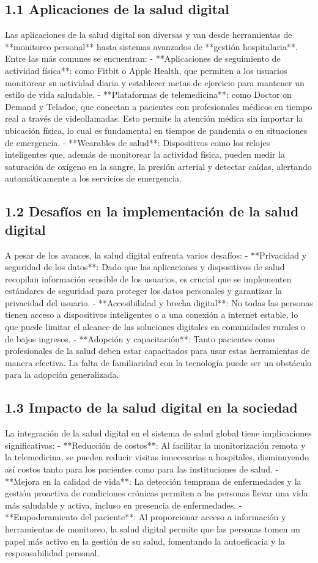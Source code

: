 \documentclass[12pt]{article}
\begin{document}
\subsection{1.1 Aplicaciones de la salud digital}
Las aplicaciones de la salud digital son diversas y van desde herramientas de **monitoreo personal** hasta sistemas avanzados de **gestión hospitalaria**. Entre las más comunes se encuentran:
- **Aplicaciones de seguimiento de actividad física**: como Fitbit o Apple Health, que permiten a los usuarios monitorear su actividad diaria y establecer metas de ejercicio para mantener un estilo de vida saludable.
- **Plataformas de telemedicina**: como Doctor on Demand y Teladoc, que conectan a pacientes con profesionales médicos en tiempo real a través de videollamadas. Esto permite la atención médica sin importar la ubicación física, lo cual es fundamental en tiempos de pandemia o en situaciones de emergencia.
- **Wearables de salud**: Dispositivos como los relojes inteligentes que, además de monitorear la actividad física, pueden medir la saturación de oxígeno en la sangre, la presión arterial y detectar caídas, alertando automáticamente a los servicios de emergencia.

\subsection{1.2 Desafíos en la implementación de la salud digital}
A pesar de los avances, la salud digital enfrenta varios desafíos:
- **Privacidad y seguridad de los datos**: Dado que las aplicaciones y dispositivos de salud recopilan información sensible de los usuarios, es crucial que se implementen estándares de seguridad para proteger los datos personales y garantizar la privacidad del usuario.
- **Accesibilidad y brecha digital**: No todas las personas tienen acceso a dispositivos inteligentes o a una conexión a internet estable, lo que puede limitar el alcance de las soluciones digitales en comunidades rurales o de bajos ingresos.
- **Adopción y capacitación**: Tanto pacientes como profesionales de la salud deben estar capacitados para usar estas herramientas de manera efectiva. La falta de familiaridad con la tecnología puede ser un obstáculo para la adopción generalizada.

\subsection{1.3 Impacto de la salud digital en la sociedad}
La integración de la salud digital en el sistema de salud global tiene implicaciones significativas:
- **Reducción de costos**: Al facilitar la monitorización remota y la telemedicina, se pueden reducir visitas innecesarias a hospitales, disminuyendo así costos tanto para los pacientes como para las instituciones de salud.
- **Mejora en la calidad de vida**: La detección temprana de enfermedades y la gestión proactiva de condiciones crónicas permiten a las personas llevar una vida más saludable y activa, incluso en presencia de enfermedades.
- **Empoderamiento del paciente**: Al proporcionar acceso a información y herramientas de monitoreo, la salud digital permite que las personas tomen un papel más activo en la gestión de su salud, fomentando la autoeficacia y la responsabilidad personal.
\end{document}
